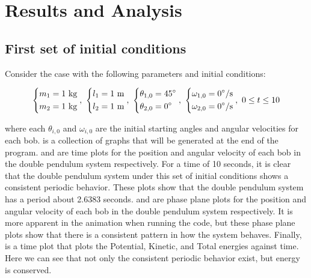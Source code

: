 \section{Results and Analysis}\label{sec:results-and-analysis}

\subsection{First set of initial conditions}\label{subsec:first-set-of-initial-conditions}

Consider the case with the following parameters and initial conditions:

\[
\begin{dcases}
    m_1 = 1\ \text{kg}\\
    m_2 = 1\ \text{kg}
\end{dcases},\ \begin{dcases}
    l_1 = 1\ \text{m}\\
    l_2 = 1\ \text{m}
\end{dcases},\ \begin{dcases}
    \theta_{1,0} = 45^\circ\\
    \theta_{2,0} = 0^\circ
\end{dcases},\ \begin{dcases}
    \omega_{1,0} = 0^\circ\text{/s}\\
    \omega_{2,0} = 0^\circ\text{/s}
\end{dcases},\ 0\leq t\leq10
\]

where each $\theta_{i,0}$ and $\omega_{i,0}$ are the initial starting angles and angular velocities for each bob.  is a collection of graphs that will be generated at the end of the program.  and  are time plots for the position and angular velocity of each bob in the double pendulum system respectively. For a time of 10 seconds, it is clear that the double pendulum system under this set of initial conditions shows a consistent periodic behavior. These plots show that the double pendulum system has a period about 2.6383 seconds.  and  are phase plane plots for the position and angular velocity of each bob in the double pendulum system respectively. It is more apparent in the animation when running the code, but these phase plane plots show that there is a consistent pattern in how the system behaves. Finally,  is a time plot that plots the Potential, Kinetic, and Total energies against time. Here we can see that not only the consistent periodic behavior exist, but energy is conserved.

